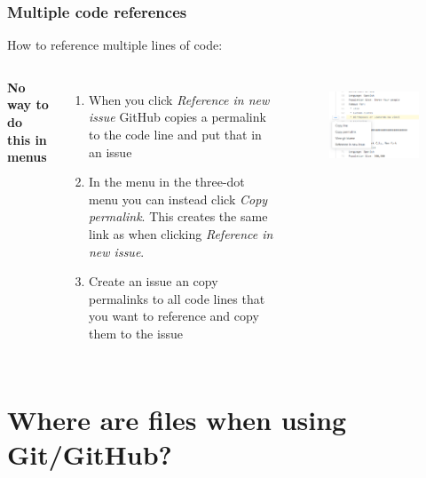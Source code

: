 \documentclass[aspectratio=169]{beamer} %
\begin{document}
\begin{frame}
	\frametitle{Multiple code references}

	How to reference multiple lines of code:
	\vspace{.5cm}

	\begin{columns}[c]

		\textbf{No way to do this in menus}
		\begin{enumerate}
			\item When you click \textit{Reference in new issue} GitHub copies a permalink to the code line and put that in an issue
			\item In the menu in the three-dot menu you can instead click \textit{Copy permalink}. This creates the same link as when clicking \textit{Reference in new issue}.
			\item Create an issue an copy permalinks to all code lines that you want to reference and copy them to the issue
		\end{enumerate}

		\begin{figure}
			\centering
			\includegraphics[width=1\linewidth]{img/reference-code-line-issue.png}
			\label{fig:branches}
		\end{figure}
	\end{columns}
\end{frame}

\section{Where are files when using Git/GitHub?}
\end{document}
